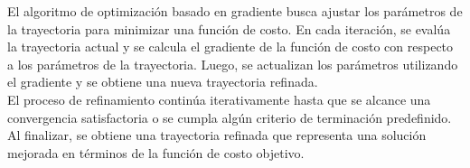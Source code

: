 \documentclass{article}
\begin{document}
\begin{itemize}
El algoritmo de optimización basado en gradiente busca ajustar los parámetros de la trayectoria para minimizar una función de costo. En cada iteración, se evalúa la trayectoria actual y se calcula el gradiente de la función de costo con respecto a los parámetros de la trayectoria. Luego, se actualizan los parámetros utilizando el gradiente y se obtiene una nueva trayectoria refinada.\\

El proceso de refinamiento continúa iterativamente hasta que se alcance una convergencia satisfactoria o se cumpla algún criterio de terminación predefinido. Al finalizar, se obtiene una trayectoria refinada que representa una solución mejorada en términos de la función de costo objetivo.   
  
\end{itemize}
  
\end{document}
